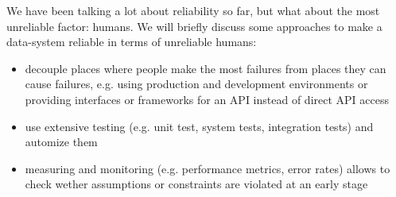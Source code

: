 We have been talking a lot about reliability so far, but what about the most unreliable factor: humans. We will briefly discuss some approaches to make a data-system reliable in terms of unreliable humans:
\begin{itemize}
			\item decouple places where people make the most failures from places they can cause failures, e.g. using production and development environments or providing interfaces or frameworks for an API instead of direct API access
			\item use extensive testing (e.g. unit test, system tests, integration tests) and automize them
			\item measuring and monitoring (e.g. performance metrics, error rates) allows to check wether assumptions or constraints are violated at an early stage \\[0.5 cm]
\end{itemize}

